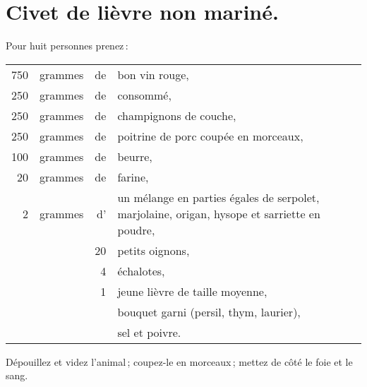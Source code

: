 \section*{\centering Civet de lièvre non mariné.}
{}

Pour huit personnes prenez :

\footnotesize
\begin{longtable}{rrrp{16em}}
    750 & grammes & de & bon vin rouge,                                                                   \\
    250 & grammes & de & consommé,                                                                        \\
    250 & grammes & de & champignons de couche,                                                           \\
    250 & grammes & de & poitrine de porc coupée en morceaux,                                             \\
    100 & grammes & de & beurre,                                                                          \\
     20 & grammes & de & farine,                                                                          \\
      2 & grammes & d' & un mélange en parties égales de serpolet, marjolaine,
                         origan, hysope et sarriette en poudre,                                           \\
        &         & 20 & petits oignons,                                                                  \\
        &         &  4 & échalotes,                                                                       \\
        &         &  1 & jeune lièvre de taille moyenne,                                                  \\
        &         &    & bouquet garni (persil, thym, laurier),                                           \\
        &         &    & sel et poivre.                                                                   \\
\end{longtable}
\normalsize

Dépouillez et videz l'animal ; coupez-le en morceaux ; mettez de côté le foie
et le sang.

